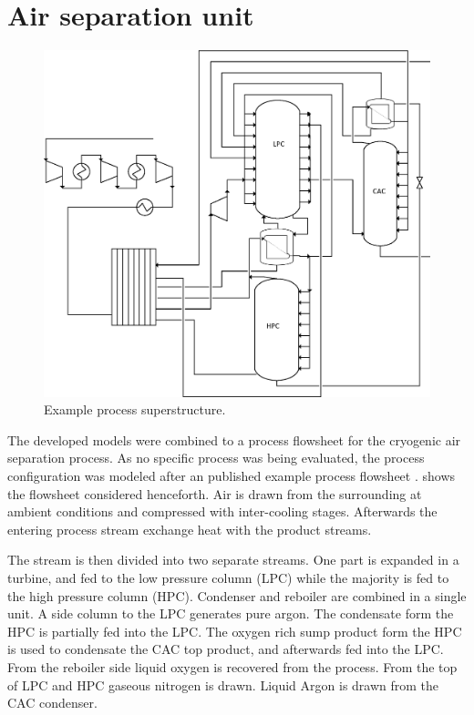     \section{Air separation unit}
    \begin{figure}
        \footnotesize
        \center
        \includegraphics[width=\linewidth]{Pictures/ASU_superstructure}
        \caption{Example process superstructure.}
        \label{fig:opt:exppro}
    \end{figure}

        The developed models were combined to a process flowsheet for the cryogenic air separation process.
        As no specific process was being evaluated, the process configuration was modeled after an
        published example process flowsheet \cite{Kooijman.}. 
        shows the flowsheet considered henceforth. Air is drawn from the surrounding at ambient conditions
        and compressed with inter-cooling stages. Afterwards the entering process stream exchange heat
        with the product streams.

        The stream is then divided into two separate streams. One part is expanded in a turbine, and fed to
        the low pressure column (LPC) while the majority is fed to the high pressure column (HPC).
        Condenser and reboiler are combined in a single unit. A side column to the LPC generates pure
        argon. The condensate form the HPC is partially fed into the LPC. The oxygen rich sump product form the HPC
        is used to condensate the CAC top product, and afterwards fed into the LPC. From the reboiler side liquid oxygen
        is recovered from the process. From the top of LPC and HPC gaseous nitrogen is drawn. Liquid Argon is drawn from
        the CAC condenser.

